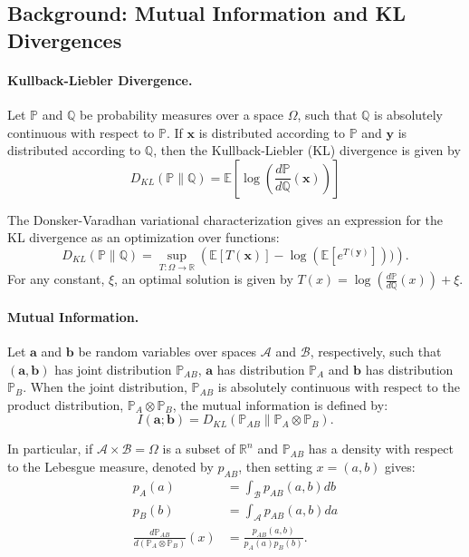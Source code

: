 \documentclass[twoside]{article}
\theoremstyle{definition}
\newcommand{\R}{\mathbb{R}}
\newcommand{\E}{\mathbb{E}}
\newcommand{\Prob}{\mathbb{P}}
\newcommand{\Q}{\mathbb{Q}}
\newcommand{\1}[1]{\scalebox{1.25}{$\mathds{1}$}\left[#1\right]}
\begin{document}
\subsection{Background: Mutual Information and KL Divergences}

\paragraph{\bf Kullback-Liebler Divergence.}
Let $\Prob$ and $\Q$ be probability measures over a space $\Omega$, such that $\Q$ is absolutely continuous with respect to $\Prob$.
If $\bm{x}$ is distributed according to $\Prob$ and $\bm{y}$ is distributed according to $\Q$, then the Kullback-Liebler (KL) divergence is given by 
$$
D_{KL}(\Prob\| \Q) = \E\left[\log\left(\frac{d\Prob}{d\Q}(\bm{x})\right)\right]
$$

The Donsker-Varadhan variational characterization gives an expression for the KL divergence as an optimization over functions:
$$D_{KL} (\mathbb{P} \| \mathbb{Q}) = \sup_{T: \Omega \to \R} \left(\E[T(\bm{x})] - \log(\E[e^{T(\bm{y})}]))\right).$$
For any constant, $\xi$, an optimal solution is given by $T(x)=\log\left(\frac{d\Prob}{d\Q}(x) \right)+\xi$. 

\paragraph{\bf Mutual Information.}

Let $\bm{a}$ and $\bm{b}$ be random variables over spaces $\mathcal{A}$ and $\mathcal{B}$, respectively, such that $(\bm{a},\bm{b})$ has joint distribution $\Prob_{AB}$, $\bm{a}$ has distribution $\Prob_A$ and $\bm{b}$ has distribution $\Prob_B$. When the joint distribution, $\Prob_{AB}$ is absolutely continuous with respect to the product distribution, $\Prob_{A}\otimes\Prob_B$, the mutual information is defined by:
$$
I(\bm{a};\bm{b})=D_{KL}(\Prob_{AB}\| \Prob_{A}\otimes \Prob_{B}).
$$

In particular, if $\mathcal{A}\times \mathcal{B}=\Omega$ is a subset of $\R^n$ and  $\Prob_{AB}$ has a density with respect to the Lebesgue measure, denoted by $p_{AB}$, then setting $x=(a,b)$ gives:
\begin{subequations}
\label{eq:densities}
\begin{align}
p_{A}(a)&=\int_{\mathcal{B}}p_{AB}(a,b)db\\
p_{B}(b)&=\int_{\mathcal{A}}p_{AB}(a,b)da\\
\frac{d\Prob_{AB}}{d\left(\Prob_A\otimes \Prob_B \right)}(x)&=\frac{p_{AB}(a,b)}{p_{A}(a)p_B(b)}.
\end{align}
\end{subequations}
\end{document}
